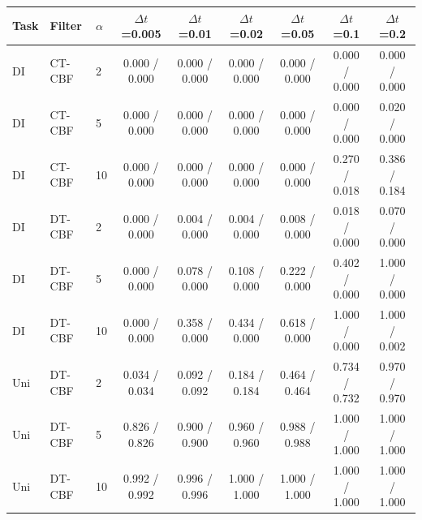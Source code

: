 \begin{tabular}{lllcccccc}
\hline
Task & Filter & $\alpha$ & $\Delta t$=0.005 & $\Delta t$=0.01 & $\Delta t$=0.02 & $\Delta t$=0.05 & $\Delta t$=0.1 & $\Delta t$=0.2 \\
\hline
DI & CT-CBF & 2 & 0.000 / 0.000 & 0.000 / 0.000 & 0.000 / 0.000 & 0.000 / 0.000 & 0.000 / 0.000 & 0.000 / 0.000 \\
DI & CT-CBF & 5 & 0.000 / 0.000 & 0.000 / 0.000 & 0.000 / 0.000 & 0.000 / 0.000 & 0.000 / 0.000 & 0.020 / 0.000 \\
DI & CT-CBF & 10 & 0.000 / 0.000 & 0.000 / 0.000 & 0.000 / 0.000 & 0.000 / 0.000 & 0.270 / 0.018 & 0.386 / 0.184 \\
\hline
DI & DT-CBF & 2 & 0.000 / 0.000 & 0.004 / 0.000 & 0.004 / 0.000 & 0.008 / 0.000 & 0.018 / 0.000 & 0.070 / 0.000 \\
DI & DT-CBF & 5 & 0.000 / 0.000 & 0.078 / 0.000 & 0.108 / 0.000 & 0.222 / 0.000 & 0.402 / 0.000 & 1.000 / 0.000 \\
DI & DT-CBF & 10 & 0.000 / 0.000 & 0.358 / 0.000 & 0.434 / 0.000 & 0.618 / 0.000 & 1.000 / 0.000 & 1.000 / 0.002 \\
\hline
Uni & DT-CBF & 2 & 0.034 / 0.034 & 0.092 / 0.092 & 0.184 / 0.184 & 0.464 / 0.464 & 0.734 / 0.732 & 0.970 / 0.970 \\
Uni & DT-CBF & 5 & 0.826 / 0.826 & 0.900 / 0.900 & 0.960 / 0.960 & 0.988 / 0.988 & 1.000 / 1.000 & 1.000 / 1.000 \\
Uni & DT-CBF & 10 & 0.992 / 0.992 & 0.996 / 0.996 & 1.000 / 1.000 & 1.000 / 1.000 & 1.000 / 1.000 & 1.000 / 1.000 \\
\hline
\end{tabular}
